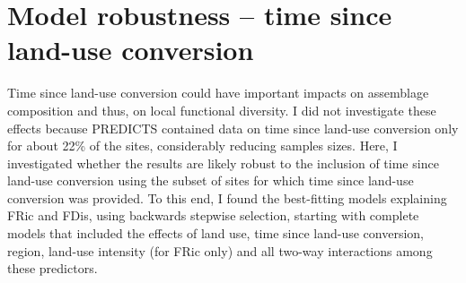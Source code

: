 \newpage
\clearpage
\section{Model robustness -- time since land-use conversion}
Time since land-use conversion could have important impacts on assemblage composition and thus, on local functional diversity. I did not investigate these effects because PREDICTS contained data on time since land-use conversion only for about 22\% of the sites, considerably reducing samples sizes. Here, I investigated whether the results are likely robust to the inclusion of time since land-use conversion using the subset of sites for which time since land-use conversion was provided. To this end, I found the best-fitting models explaining FRic and FDis, using backwards stepwise selection, starting with complete models that included the effects of land use, time since land-use conversion, region, land-use intensity (for FRic only) and all two-way interactions among these predictors. 

